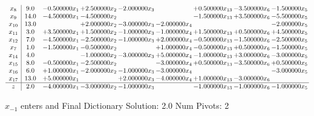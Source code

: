 \documentclass[10pt]{article}
\begin{document}
 \[\begin{array}{c| c c@{\hskip 2pt} c@{\hskip 2pt} c@{\hskip 2pt} c@{\hskip 2pt} c@{\hskip 2pt} c@{\hskip 2pt} c@{\hskip 2pt} }
 x_{8}   &  9.0 & -0.500000 x_{1} & + 2.500000 x_{2} & -2.000000 x_{3} &   & + 0.500000 x_{13} & -3.500000 x_{6} & -1.500000 x_{5}\\
 x_{9}   &  14.0 & -4.500000 x_{1} & -4.500000 x_{2} &    &   & -1.500000 x_{13} & + 3.500000 x_{6} & -5.500000 x_{5}\\
 x_{10}   &  13.0  &   & + 2.000000 x_{2} & -3.000000 x_{3} & -2.000000 x_{4} &    &   & -2.000000 x_{5}\\
 x_{11}   &  3.0 & + 3.500000 x_{1} & + 1.500000 x_{2} & -1.000000 x_{3} & -1.000000 x_{4} & + 1.500000 x_{13} & + 0.500000 x_{6} & + 4.500000 x_{5}\\
 x_{12}   &  7.0 & -4.500000 x_{1} & -2.500000 x_{2} & -1.000000 x_{3} & + 2.000000 x_{4} & -0.500000 x_{13} & -1.500000 x_{6} & -2.500000 x_{5}\\
 x_{7}   &  1.0 & -1.500000 x_{1} & -0.500000 x_{2} &   & + 1.000000 x_{4} & -0.500000 x_{13} & + 0.500000 x_{6} & -1.500000 x_{5}\\
 x_{14}   &  4.0  &   & -1.000000 x_{2} & -3.000000 x_{3} & + 5.000000 x_{4} & -1.000000 x_{13} & + 3.000000 x_{6} & -3.000000 x_{5}\\
 x_{15}   &  8.0 & -0.500000 x_{1} & -2.500000 x_{2} &   & -3.000000 x_{4} & + 0.500000 x_{13} & -3.500000 x_{6} & + 0.500000 x_{5}\\
 x_{16}   &  6.0 & + 1.000000 x_{1} & -2.000000 x_{2} & -1.000000 x_{3} & -3.000000 x_{4} &    &   & -3.000000 x_{5}\\
 x_{17}   &  13.0 & + 5.000000 x_{1} &   & + 2.000000 x_{3} & -4.000000 x_{4} & + 1.000000 x_{13} & -3.000000 x_{6} &   \\
\hline
z    &  2.0 & -4.000000 x_{1} & -3.000000 x_{2} & -1.000000 x_{3} &   & -1.000000 x_{13} & -1.000000 x_{6} & -1.000000 x_{5}\\
\end{array}\]


 $ x_{-1} $ enters and Final Dictionary
Solution:  2.0
Num Pivots:  2
\end{document}
